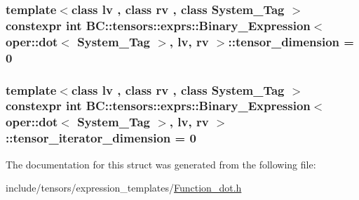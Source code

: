 \subsubsection[{\texorpdfstring{tensor\+\_\+dimension}{tensor_dimension}}]{\setlength{\rightskip}{0pt plus 5cm}template$<$class lv , class rv , class System\+\_\+\+Tag $>$ constexpr int {\bf B\+C\+::tensors\+::exprs\+::\+Binary\+\_\+\+Expression}$<$ {\bf oper\+::dot}$<$ System\+\_\+\+Tag $>$, lv, rv $>$\+::tensor\+\_\+dimension = 0\hspace{0.3cm}{\ttfamily [static]}}\hypertarget{structBC_1_1tensors_1_1exprs_1_1Binary__Expression_3_01oper_1_1dot_3_01System__Tag_01_4_00_01lv_00_01rv_01_4_a427270424bc3aa0702c8a3bffd77e1c8}{}\label{structBC_1_1tensors_1_1exprs_1_1Binary__Expression_3_01oper_1_1dot_3_01System__Tag_01_4_00_01lv_00_01rv_01_4_a427270424bc3aa0702c8a3bffd77e1c8}
\subsubsection[{\texorpdfstring{tensor\+\_\+iterator\+\_\+dimension}{tensor_iterator_dimension}}]{\setlength{\rightskip}{0pt plus 5cm}template$<$class lv , class rv , class System\+\_\+\+Tag $>$ constexpr int {\bf B\+C\+::tensors\+::exprs\+::\+Binary\+\_\+\+Expression}$<$ {\bf oper\+::dot}$<$ System\+\_\+\+Tag $>$, lv, rv $>$\+::tensor\+\_\+iterator\+\_\+dimension = 0\hspace{0.3cm}{\ttfamily [static]}}\hypertarget{structBC_1_1tensors_1_1exprs_1_1Binary__Expression_3_01oper_1_1dot_3_01System__Tag_01_4_00_01lv_00_01rv_01_4_a832141f8e846880d4c03292accd383a5}{}\label{structBC_1_1tensors_1_1exprs_1_1Binary__Expression_3_01oper_1_1dot_3_01System__Tag_01_4_00_01lv_00_01rv_01_4_a832141f8e846880d4c03292accd383a5}


The documentation for this struct was generated from the following file\+:\begin{DoxyCompactItemize}
\item 
include/tensors/expression\+\_\+templates/\hyperlink{Function__dot_8h}{Function\+\_\+dot.\+h}\end{DoxyCompactItemize}
